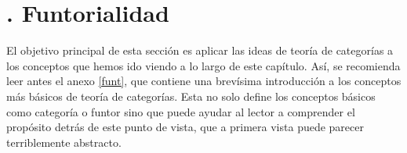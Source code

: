 
\section{. Funtorialidad}

El objetivo principal de esta sección es aplicar las ideas de teoría de categorías a los conceptos que hemos ido viendo a lo largo de este capítulo. Así, se recomienda leer antes el anexo \ref{funt}, que contiene una brevísima introducción a los conceptos más básicos de teoría de categorías. Esta no solo define los conceptos básicos como categoría o funtor sino que puede ayudar al lector a comprender el propósito detrás de este punto de vista, que a primera vista puede parecer terriblemente abstracto.

